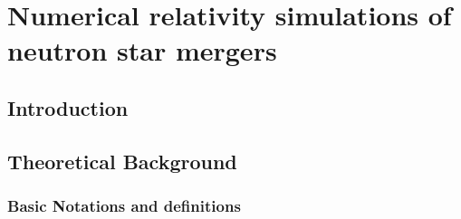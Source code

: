 \part{Numerical relativity simulations of neutron star mergers}




\chapter{Introduction}



\chapter{Theoretical Background} %


\section{Basic Notations and definitions}

